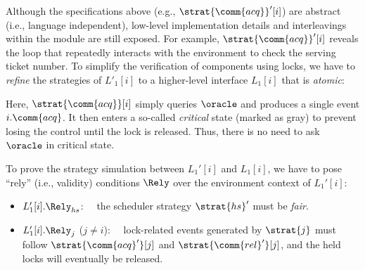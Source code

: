  Although the specifications above (e.g., $\strat{\comm{acq}}'[i]$) are abstract (i.e., language independent),
low-level implementation details and interleavings within the module are still exposed.
For example, $\strat{\comm{acq}}'[i]$ reveals the loop that repeatedly interacts with the environment to check the serving ticket number.
To simplify the verification of components using locks, we have to \emph{refine} the strategies of $L'_1[i]$ to a higher-level interface $L_1[i]$ that is \emph{atomic}:%
\begin{center}
\end{center}
Here, $\strat{\comm{acq}}[i]$ simply queries $\oracle$
and produces a single event $i.\comm{acq}$. It then enters  a so-called
\emph{critical} state (marked as gray) to prevent losing the control until  the lock is released. Thus, there is no need to  ask $\oracle$ in critical state. 

To prove the strategy simulation between $L_1'[i]$ and $L_1[i]$, we have to  pose ``rely'' (i.e.,
validity) conditions $\Rely$ over the environment context of $L_1'[i]$:

\begin{itemize}\itemsep1em
\item $L_1'[i].\Rely_{hs}$:~~  the scheduler strategy $\strat{hs}'$ must be \emph{fair}.
\item $L_1'[i].\Rely_{j}$ ($j\neq i$):~~ lock-related events 
 generated by $\strat{j}$ must follow $\strat{\comm{acq}'}[j]$ and $\strat{\comm{rel}'}[j]$, and the held locks will eventually be released.
\end{itemize}

